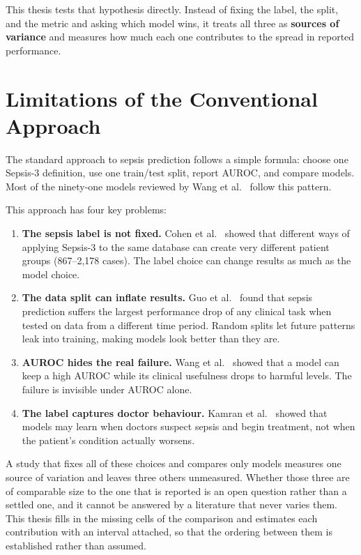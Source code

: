 This thesis tests that hypothesis directly. Instead of fixing the label, the
split, and the metric and asking which model wins, it treats all three as
\textbf{sources of variance} and measures how much each one contributes to the
spread in reported performance.


\section{Limitations of the Conventional Approach}

The standard approach to sepsis prediction follows a simple formula: choose one
Sepsis-3 definition, use one train/test split, report AUROC, and compare models.
Most of the ninety-one models reviewed by Wang et al.\ \cite{wang2025srpm}
follow this pattern.

This approach has four key problems:

\begin{enumerate}
    \item \textbf{The sepsis label is not fixed.} Cohen et al.\
    \cite{cohen2024subtle} showed that different ways of applying Sepsis-3 to
    the same database can create very different patient groups (867--2,178 cases).
    The label choice can change results as much as the model choice.

    \item \textbf{The data split can inflate results.} Guo et al.\
    \cite{guo2022temporal} found that sepsis prediction suffers the largest
    performance drop of any clinical task when tested on data from a different time
    period. Random splits let future patterns leak into training, making models
    look better than they are.

    \item \textbf{AUROC hides the real failure.} Wang et al.\
    \cite{wang2025srpm} showed that a model can keep a high AUROC while its
    clinical usefulness drops to harmful levels. The failure is invisible under
    AUROC alone.

    \item \textbf{The label captures doctor behaviour.} Kamran et al.\
    \cite{kamran2024evaluation} showed that models may learn when doctors
    suspect sepsis and begin treatment, not when the patient's condition actually
    worsens.
\end{enumerate}

A study that fixes all of these choices and compares only models measures one
source of variation and leaves three others unmeasured. Whether those three are
of comparable size to the one that is reported is an open question rather than
a settled one, and it cannot be answered by a literature that never varies
them. This thesis fills in the missing cells of the comparison and estimates
each contribution with an interval attached, so that the ordering between them
is established rather than assumed.


